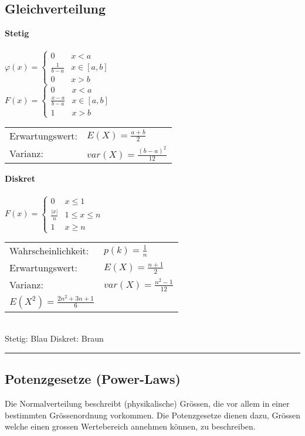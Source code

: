 \subsection{Gleichverteilung}
\begin{multicols}{3}
	\textbf{Stetig}\\ \\
	$\varphi(x) = \begin{cases}
	0 & x < a\\
	\frac{1}{b-a} & x \in [a, b]\\
	0 & x > b
	\end{cases}$ \\
	$F(x) = \begin{cases}
	0 & x < a\\
	\frac{x-a}{b-a} & x \in [a,b]\\
	1 & x > b
	\end{cases}$\\
	\begin{tabular}{ll}
		Erwartungswert: & $E(X)=\frac{a + b}{2}$\\
		Varianz:  &$var(X)=\frac{(b-a)^2}{12}$\\
	\end{tabular}
	\columnbreak
	
	\textbf{Diskret}\\ \\
	$F(x) = \begin{cases}
	0 & x \leq 1\\
	\frac{|x|}{n} & 1 \leq x \leq n \\
	1 & x \geq n
	\end{cases}$\\
	\begin{tabular}{ll}
		Wahrscheinlichkeit: & $p(k) = \frac{1}{n}$\\
		Erwartungswert: & $E(X)=\frac{n + 1}{2}$\\
		Varianz: & $var(X)=\frac{n^2-1}{12}$\\
		$E(X^2) = \frac{2n^2+3n+1}{6}$ &
	\end{tabular}
	\columnbreak
   	\\ 
	Stetig: Blau \quad Diskret: Braun
\end{multicols}
  
\hrule 
      
\subsection{Potenzgesetze (Power-Laws)}
Die Normalverteilung beschreibt (physikalische) Grössen, die vor allem in einer bestimmten
Grössenordnung vorkommen. Die Potenzgesetze dienen dazu, Grössen welche einen grossen
Wertebereich annehmen können, zu beschreiben.
	
